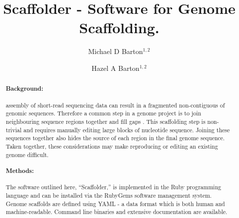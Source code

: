 \documentclass[10pt]{bmc_article}
\newenvironment{bmcformat}{\begin{raggedright}\baselineskip20pt\sloppy\setboolean{publ}{false}}{\end{raggedright}\baselineskip20pt\sloppy}
\begin{document}
\begin{bmcformat}

\title{Scaffolder - Software for  Genome
Scaffolding.}

\author{
  Michael D Barton$^{1,2}$\correspondingauthor%
\and
  Hazel A Barton$^{1,2}$%
      }

\address{
\iid(1) Biology Department, The University of Akron, Akron, %
OH 44325-3908, USA \\
\iid(2) Department of Biological Sciences, Northern Kentucky %
University, Nunn Drive, Highland Heights, KY 41076, USA }%

\maketitle

\clearpage

\begin{abstract} %

  \paragraph*{Background:}  assembly of 
  short-read sequencing data can result in a fragmented non-contiguous
   of genomic sequences. Therefore a common step in
  a genome project is to join neighbouring sequence regions together and fill
  gaps . This scaffolding
  step is non-trivial and requires manually editing large
  blocks of nucleotide sequence. Joining these sequences together also hides
  the source of each region in the final genome sequence. Taken together,
  these considerations may make reproducing or editing an existing genome
   difficult.

  \paragraph*{Methods:} The software outlined here, ``Scaffolder,'' is
  implemented in the Ruby programming language and can be installed via the
  RubyGems software management system. Genome scaffolds are defined using YAML
  - a data format\remove{,} which is both human and machine-readable. Command
  line binaries and extensive documentation are available.


\end{abstract}
\end{bmcformat}
\end{document}
